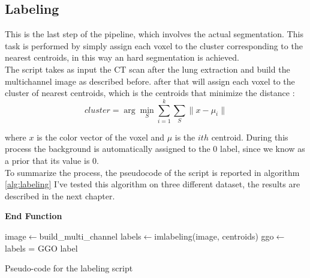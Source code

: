 
	
	\subsection{Labeling}
	
	This is the last step of the pipeline, which involves the actual segmentation. This task is performed by simply assign each voxel to the cluster corresponding to the nearest centroids, in this way an hard segmentation is achieved.\\
	
	The script takes as input the CT scan after the lung extraction and build the multichannel image as described before. after that will assign each voxel to the cluster of nearest centroids, which is the centroids that minimize the distance : 
	\begin{equation}
		cluster = \arg\min_{S}  \sum_{i=1}^k \sum_{S} \| x - \mu_i\|
	\end{equation}

	where $x$ is the color vector of the voxel and $\mu$ is the $ith$ centroid. During this process the background is automatically assigned to the 0 label, since we know as a prior that its value is $0$.\\
	To summarize the process, the pseudocode of the script is reported in algorithm\,\ref{alg:labeling}
	 I've tested this algorithm on three different dataset, the results are described in the next chapter.
	 
	 	\begin{algorithm}
	 	\label{alg:labeling}
	 	\SetAlgoLined
	 	\DontPrintSemicolon
	 	
	 	
	 	\textbf{\textbf{End Function}}
 	
 		
 		image$\leftarrow$build\_multi\_channel\;
 		labels$\leftarrow$imlabeling(image, centroids)\;
 		ggo$\leftarrow$ labels = GGO label\;
	 
	 	\caption{Pseudo-code for the labeling script}
	 
	 \end{algorithm}
	 
	
	

